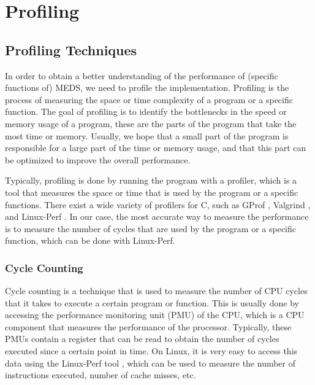 \documentclass[11pt,a4paper]{report}
\theoremstyle{definition}
\begin{document}
\chapter{Profiling}
\label{ch:profiling}
\section{Profiling Techniques}
In order to obtain a better understanding of the performance of (specific functions of) MEDS, we need to profile the implementation. Profiling is the process of measuring the space or time complexity of a program or a specific function. The goal of profiling is to identify the bottlenecks in the speed or memory usage of a program, these are the parts of the program that take the most time or memory. Usually, we hope that a small part of the program is responsible for a large part of the time or memory usage, and that this part can be optimized to improve the overall performance.

Typically, profiling is done by running the program with a profiler, which is a tool that measures the space or time that is used by the program or a specific functions. There exist a wide variety of profilers for C, such as GProf \cite{graham1982gprof}, Valgrind \cite{nethercote2007valgrind}, and Linux-Perf \cite{de2010new}. In our case, the most accurate way to measure the performance is to measure the number of cycles that are used by the program or a specific function, which can be done with Linux-Perf.

\subsection{Cycle Counting}
Cycle counting is a technique that is used to measure the number of CPU cycles that it takes to execute a certain program or function. This is usually done by accessing the performance monitoring unit (PMU) of the CPU, which is a CPU component that measures the performance of the processor. Typically, these PMUs contain a register that can be read to obtain the number of cycles executed since a certain point in time. On Linux, it is very easy to access this data using the Linux-Perf tool \cite{de2010new}, which can be used to measure the number of instructions executed, number of cache misses, etc.
\end{document}

